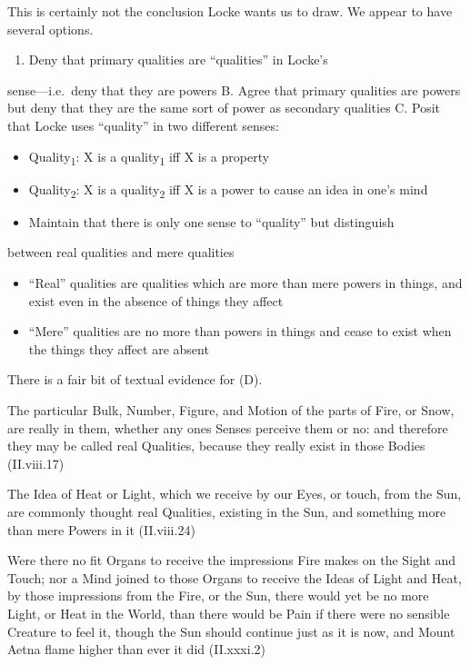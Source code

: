 \documentclass[12pt]{article}
\begin{document}
This is certainly not the conclusion Locke wants us to draw. We appear
to have several options.

\begin{enumerate}
\item Deny that primary qualities are ``qualities'' in Locke's
\end{enumerate}
sense---i.e. deny that they are powers B. Agree that primary qualities
are powers but deny that they are the same sort of power as secondary
qualities C. Posit that Locke uses ``quality'' in two different senses:

\begin{itemize}
\item Quality\textsubscript{1}: X is a quality\textsubscript{1} iff X is a property
\item Quality\textsubscript{2}: X is a quality\textsubscript{2} iff X is a power to cause an idea in
one's mind

\item Maintain that there is only one sense to ``quality'' but distinguish
\end{itemize}
between real qualities and mere qualities

\begin{itemize}
\item ``Real'' qualities are qualities which are more than mere powers in
things, and exist even in the absence of things they affect
\item ``Mere'' qualities are no more than powers in things and cease to exist
when the things they affect are absent
\end{itemize}

There is a fair bit of textual evidence for (D).

\begin{quote-b}
The particular Bulk, Number, Figure, and Motion of the parts of Fire,
or Snow, are really in them, whether any ones Senses perceive them or
no: and therefore they may be called real Qualities, because they
really exist in those Bodies (II.viii.17)
\end{quote-b}

\begin{quote-b}
The Idea of Heat or Light, which we receive by our Eyes, or touch,
from the Sun, are commonly thought real Qualities, existing in the
Sun, and something more than mere Powers in it (II.viii.24)
\end{quote-b}

\begin{quote-b}
Were there no fit Organs to receive the impressions Fire makes on the
Sight and Touch; nor a Mind joined to those Organs to receive the
Ideas of Light and Heat, by those impressions from the Fire, or the
Sun, there would yet be no more Light, or Heat in the World, than
there would be Pain if there were no sensible Creature to feel it,
though the Sun should continue just as it is now, and Mount Aetna
flame higher than ever it did (II.xxxi.2)
\end{quote-b}
\end{document}
